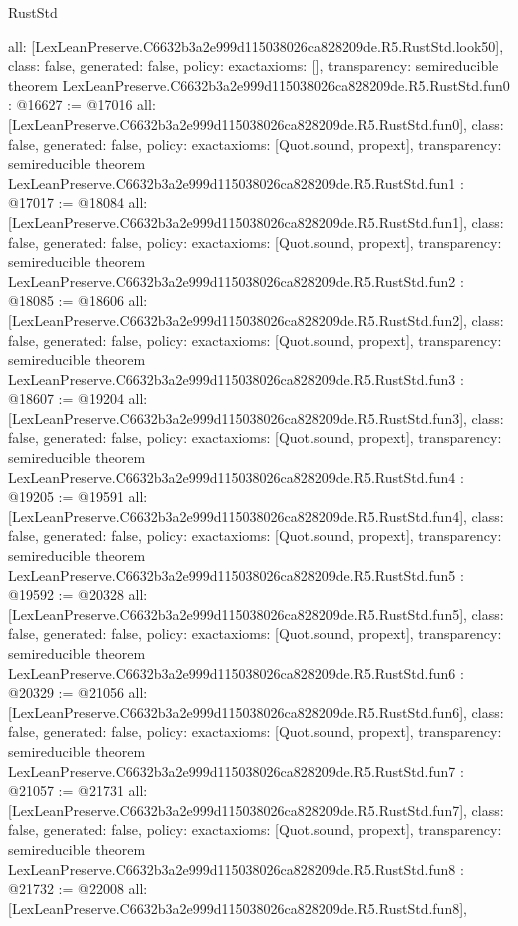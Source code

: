 \begin{lexlean}{RustStd}
\begin{coremodule}
{  all: [LexLeanPreserve.C6632b3a2e999d115038026ca828209de.R5.RustStd.look50],
  class: false,
  generated: false,
  policy: exact{axioms: []},
  transparency: semireducible
}
theorem LexLeanPreserve.C6632b3a2e999d115038026ca828209de.R5.RustStd.fun0 : @16627 := @17016 {
  all: [LexLeanPreserve.C6632b3a2e999d115038026ca828209de.R5.RustStd.fun0],
  class: false,
  generated: false,
  policy: exact{axioms: [Quot.sound, propext]},
  transparency: semireducible
}
theorem LexLeanPreserve.C6632b3a2e999d115038026ca828209de.R5.RustStd.fun1 : @17017 := @18084 {
  all: [LexLeanPreserve.C6632b3a2e999d115038026ca828209de.R5.RustStd.fun1],
  class: false,
  generated: false,
  policy: exact{axioms: [Quot.sound, propext]},
  transparency: semireducible
}
theorem LexLeanPreserve.C6632b3a2e999d115038026ca828209de.R5.RustStd.fun2 : @18085 := @18606 {
  all: [LexLeanPreserve.C6632b3a2e999d115038026ca828209de.R5.RustStd.fun2],
  class: false,
  generated: false,
  policy: exact{axioms: [Quot.sound, propext]},
  transparency: semireducible
}
theorem LexLeanPreserve.C6632b3a2e999d115038026ca828209de.R5.RustStd.fun3 : @18607 := @19204 {
  all: [LexLeanPreserve.C6632b3a2e999d115038026ca828209de.R5.RustStd.fun3],
  class: false,
  generated: false,
  policy: exact{axioms: [Quot.sound, propext]},
  transparency: semireducible
}
theorem LexLeanPreserve.C6632b3a2e999d115038026ca828209de.R5.RustStd.fun4 : @19205 := @19591 {
  all: [LexLeanPreserve.C6632b3a2e999d115038026ca828209de.R5.RustStd.fun4],
  class: false,
  generated: false,
  policy: exact{axioms: [Quot.sound, propext]},
  transparency: semireducible
}
theorem LexLeanPreserve.C6632b3a2e999d115038026ca828209de.R5.RustStd.fun5 : @19592 := @20328 {
  all: [LexLeanPreserve.C6632b3a2e999d115038026ca828209de.R5.RustStd.fun5],
  class: false,
  generated: false,
  policy: exact{axioms: [Quot.sound, propext]},
  transparency: semireducible
}
theorem LexLeanPreserve.C6632b3a2e999d115038026ca828209de.R5.RustStd.fun6 : @20329 := @21056 {
  all: [LexLeanPreserve.C6632b3a2e999d115038026ca828209de.R5.RustStd.fun6],
  class: false,
  generated: false,
  policy: exact{axioms: [Quot.sound, propext]},
  transparency: semireducible
}
theorem LexLeanPreserve.C6632b3a2e999d115038026ca828209de.R5.RustStd.fun7 : @21057 := @21731 {
  all: [LexLeanPreserve.C6632b3a2e999d115038026ca828209de.R5.RustStd.fun7],
  class: false,
  generated: false,
  policy: exact{axioms: [Quot.sound, propext]},
  transparency: semireducible
}
theorem LexLeanPreserve.C6632b3a2e999d115038026ca828209de.R5.RustStd.fun8 : @21732 := @22008 {
  all: [LexLeanPreserve.C6632b3a2e999d115038026ca828209de.R5.RustStd.fun8],
}
\end{coremodule}
\end{lexlean}
